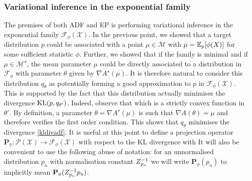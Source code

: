 
\subsubsection{Variational inference in the exponential family}
%
The premises of both ADF and EP is performing variational inference in the exponential family $\mathcal F_{\phi}(\mathcal X)$. In the previous point, we showed that a target distribution $p$ could be associated with a point $\mu\in\mathcal M$ with $\mu=\mathbb E_{p}[\phi(X)]$ for some sufficient statistic $\phi$. Further, we showed that if the family is minimal and if $\mu\in\mathcal M^{\star}$, the mean parameter $\mu$ could be directly associated to a distribution in $\mathcal F_{\phi}$ with parameter $\theta$ given by $\nabla A^{\star}(\mu)$. It is therefore natural to consider this distribution $q_{\theta}$ as potentially forming a good approximation to $p$ in $\mathcal F_{\phi}(\mathcal X)$.
%
This is supported by the fact that this distribution actually minimises the divergence $\mathrm{KL}\!\left(p,q_{\theta'}\right)$. Indeed, observe that
%
%
which is a strictly convex function in $\theta'$. By definition, a parameter $\theta=\nabla A^{\star}(\mu)$ is such that $\nabla A(\theta)=\mu$ and therefore verifies the first order condition. This shows that $q_{\theta}$ minimises the divergence \eqref{kldivadf}. It is useful at this point to define a projection operator $\mathbf P_{\phi}:\mathcal P(\mathcal X) \to \mathcal F_{\phi}(\mathcal X)$ with respect to the KL divergence with
%
%
It will also be convenient to use the following abuse of notation: for an unnormalised distribution $p_{u}$ with normalisation constant $Z_{p_{u}}^{-1}$ we will write $\mathbf P_{\phi}(p_{u})$ to implicitly mean $\mathbf P_{\phi}(Z_{p_{u}}^{-1} p_{u})$.\\

